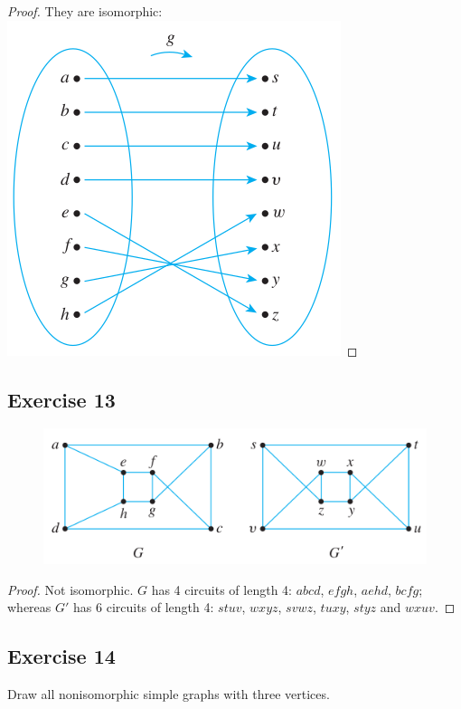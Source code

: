 \documentclass[14pt]{extarticle}
\begin{document}
\begin{proof}
They are isomorphic: 
\includegraphics[scale=0.4]{../images/10.3.12.1.png}
\end{proof}

\subsection{Exercise 13}
\begin{figure}[ht!]
\centering
\includegraphics[scale=0.5]{../images/10.3.13.png}
\end{figure}

\begin{proof}
Not isomorphic. \(G\) has 4 circuits of length 4: \(abcd\), \(efgh\), \(aehd\), \(bcfg\); whereas \(G'\) has 6 circuits of
length 4: \(stuv\), \(wxyz\), \(svwz\), \(tuxy\), \(styz\) and \(wxuv\).
\end{proof}

\subsection{Exercise 14}
Draw all nonisomorphic simple graphs with three vertices.
\end{document}
